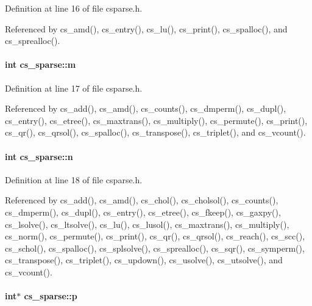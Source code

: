 Definition at line 16 of file csparse.\-h.



Referenced by cs\-\_\-amd(), cs\-\_\-entry(), cs\-\_\-lu(), cs\-\_\-print(), cs\-\_\-spalloc(), and cs\-\_\-sprealloc().

\hypertarget{structcs__sparse_a8aeba3ffed4d599a4906e78329d3448b}{
\paragraph[{m}]{\setlength{\rightskip}{0pt plus 5cm}int cs\-\_\-sparse\-::m}}\label{structcs__sparse_a8aeba3ffed4d599a4906e78329d3448b}


Definition at line 17 of file csparse.\-h.



Referenced by cs\-\_\-add(), cs\-\_\-amd(), cs\-\_\-counts(), cs\-\_\-dmperm(), cs\-\_\-dupl(), cs\-\_\-entry(), cs\-\_\-etree(), cs\-\_\-maxtrans(), cs\-\_\-multiply(), cs\-\_\-permute(), cs\-\_\-print(), cs\-\_\-qr(), cs\-\_\-qrsol(), cs\-\_\-spalloc(), cs\-\_\-transpose(), cs\-\_\-triplet(), and cs\-\_\-vcount().

\hypertarget{structcs__sparse_a86c18870dc1551c71f8ea551efe68625}{
\paragraph[{n}]{\setlength{\rightskip}{0pt plus 5cm}int cs\-\_\-sparse\-::n}}\label{structcs__sparse_a86c18870dc1551c71f8ea551efe68625}


Definition at line 18 of file csparse.\-h.



Referenced by cs\-\_\-add(), cs\-\_\-amd(), cs\-\_\-chol(), cs\-\_\-cholsol(), cs\-\_\-counts(), cs\-\_\-dmperm(), cs\-\_\-dupl(), cs\-\_\-entry(), cs\-\_\-etree(), cs\-\_\-fkeep(), cs\-\_\-gaxpy(), cs\-\_\-lsolve(), cs\-\_\-ltsolve(), cs\-\_\-lu(), cs\-\_\-lusol(), cs\-\_\-maxtrans(), cs\-\_\-multiply(), cs\-\_\-norm(), cs\-\_\-permute(), cs\-\_\-print(), cs\-\_\-qr(), cs\-\_\-qrsol(), cs\-\_\-reach(), cs\-\_\-scc(), cs\-\_\-schol(), cs\-\_\-spalloc(), cs\-\_\-splsolve(), cs\-\_\-sprealloc(), cs\-\_\-sqr(), cs\-\_\-symperm(), cs\-\_\-transpose(), cs\-\_\-triplet(), cs\-\_\-updown(), cs\-\_\-usolve(), cs\-\_\-utsolve(), and cs\-\_\-vcount().

\hypertarget{structcs__sparse_a263a2347e8dcf1a7a20ee66730297b85}{
\paragraph[{p}]{\setlength{\rightskip}{0pt plus 5cm}int$\ast$ cs\-\_\-sparse\-::p}}\label{structcs__sparse_a263a2347e8dcf1a7a20ee66730297b85}


